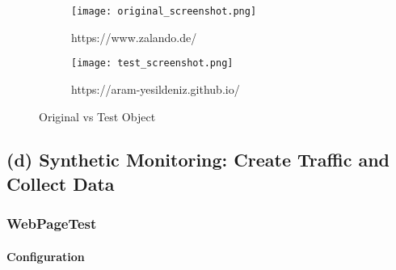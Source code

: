 




\begin{figure}
	\centering
	\begin{subfigure}{.5\textwidth}
		\centering
		\texttt{[image: original\_screenshot.png]}
		\caption{https://www.zalando.de/}
		\label{fig:sub1}
	\end{subfigure}%
	\begin{subfigure}{.5\textwidth}
		\centering
		\texttt{[image: test\_screenshot.png]}
		\caption{https://aram-yesildeniz.github.io/}
		\label{fig:sub2}
	\end{subfigure}
	\caption{Original vs Test Object}
	\label{figure:plt_original_test}
\end{figure}






\subsection{(d) Synthetic Monitoring: Create Traffic and Collect Data}





\subsubsection{WebPageTest}





\paragraph{Configuration}

